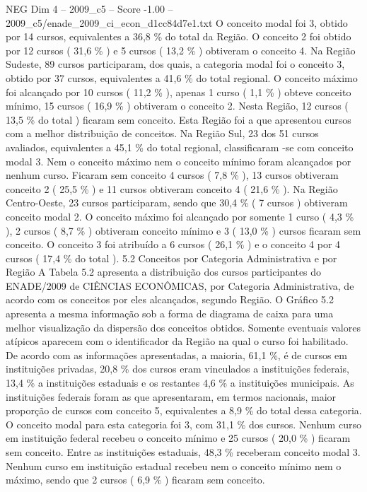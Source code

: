 \begin{textsample}{NEG Dim 4 – 2009\_c5 – Score -1.00 – 2009\_c5/enade\_2009\_ci\_econ\_d1cc84d7e1.txt}
O conceito modal foi 3, obtido por 14 cursos, equivalentes a 36,8 \% do total da Região.
O conceito 2 foi obtido por 12 cursos ( 31,6 \% ) e 5 cursos ( 13,2 \% ) obtiveram o conceito 4.
Na Região Sudeste, 89 cursos participaram, dos quais, a categoria modal foi o conceito 3, obtido por 37 cursos, equivalentes a 41,6 \% do total regional.
O conceito máximo foi alcançado por 10 cursos ( 11,2 \% ), apenas 1 curso ( 1,1 \% ) obteve conceito mínimo, 15 cursos ( 16,9 \% ) obtiveram o conceito 2.
Nesta Região, 12 cursos ( 13,5 \% do total ) ficaram sem conceito.
Esta Região foi a que apresentou cursos com a melhor distribuição de conceitos.
Na Região Sul, 23 dos 51 cursos avaliados, equivalentes a 45,1 \% do total regional, classificaram -se com conceito modal 3.
Nem o conceito máximo nem o conceito mínimo foram alcançados por nenhum curso.
Ficaram sem conceito 4 cursos ( 7,8 \% ), 13 cursos obtiveram conceito 2 ( 25,5 \% ) e 11 cursos obtiveram conceito 4 ( 21,6 \% ).
Na Região Centro-Oeste, 23 cursos participaram, sendo que 30,4 \% ( 7 cursos ) obtiveram conceito modal 2.
O conceito máximo foi alcançado por somente 1 curso ( 4,3 \% ), 2 cursos ( 8,7 \% ) obtiveram conceito mínimo e 3 ( 13,0 \% ) cursos ficaram sem conceito.
O conceito 3 foi atribuído a 6 cursos ( 26,1 \% ) e o conceito 4 por 4 cursos ( 17,4 \% do total ). 5.2 Conceitos por Categoria Administrativa e por Região A Tabela 5.2 apresenta a distribuição dos cursos participantes do ENADE/2009 de CIÊNCIAS ECONÔMICAS, por Categoria Administrativa, de acordo com os conceitos por eles alcançados, segundo Região.
O Gráfico 5.2 apresenta a mesma informação sob a forma de diagrama de caixa para uma melhor visualização da dispersão dos conceitos obtidos.
Somente eventuais valores atípicos aparecem com o identificador da Região na qual o curso foi habilitado.
De acordo com as informações apresentadas, a maioria, 61,1 \%, é de cursos em instituições privadas, 20,8 \% dos cursos eram vinculados a instituições federais, 13,4 \% a instituições estaduais e os restantes 4,6 \% a instituições municipais.
As instituições federais foram as que apresentaram, em termos nacionais, maior proporção de cursos com conceito 5, equivalentes a 8,9 \% do total dessa categoria.
O conceito modal para esta categoria foi 3, com 31,1 \% dos cursos.
Nenhum curso em instituição federal recebeu o conceito mínimo e 25 cursos ( 20,0 \% ) ficaram sem conceito.
Entre as instituições estaduais, 48,3 \% receberam conceito modal 3.
Nenhum curso em instituição estadual recebeu nem o conceito mínimo nem o máximo, sendo que 2 cursos ( 6,9 \% ) ficaram sem conceito.

\end{textsample}
